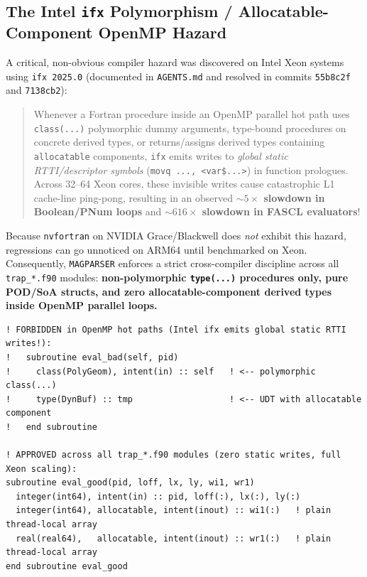 \subsection{The Intel \texttt{ifx} Polymorphism / Allocatable-Component OpenMP Hazard}
A critical, non-obvious compiler hazard was discovered on Intel Xeon systems using \texttt{ifx 2025.0} (documented in \texttt{AGENTS.md} and resolved in commits \texttt{55b8c2f} and \texttt{7138cb2}):
\begin{quote}
  Whenever a Fortran procedure inside an OpenMP parallel hot path uses \texttt{class(...)} polymorphic dummy arguments, type-bound procedures on concrete derived types, or returns/assigns derived types containing \texttt{allocatable} components, \texttt{ifx} emits writes to \emph{global static RTTI/descriptor symbols} (\texttt{movq ..., <var\$...>}) in function prologues. Across 32--64 Xeon cores, these invisible writes cause catastrophic L1 cache-line ping-pong, resulting in an observed \textbf{$\sim 5\times$ slowdown in Boolean/PNum loops} and \textbf{$\sim 616\times$ slowdown in FASCL evaluators}!
\end{quote}
Because \texttt{nvfortran} on NVIDIA Grace/Blackwell does \emph{not} exhibit this hazard, regressions can go unnoticed on ARM64 until benchmarked on Xeon. Consequently, \texttt{MAGPARSER} enforces a strict cross-compiler discipline across all \texttt{trap\_*.f90} modules: \textbf{non-polymorphic \texttt{type(...)} procedures only, pure POD/SoA structs, and zero allocatable-component derived types inside OpenMP parallel loops.}

\begin{lstlisting}[caption={Forbidden polymorphic/allocatable-UDT pattern (causes \texttt{ifx} L1 RTTI ping-pong) vs.\ approved POD/SoA pattern enforced across \texttt{src/trap\_*.f90}.},label={lst:ifx_hazard}]
! FORBIDDEN in OpenMP hot paths (Intel ifx emits global static RTTI writes!):
!   subroutine eval_bad(self, pid)
!     class(PolyGeom), intent(in) :: self   ! <-- polymorphic class(...)
!     type(DynBuf) :: tmp                   ! <-- UDT with allocatable component
!   end subroutine

! APPROVED across all trap_*.f90 modules (zero static writes, full Xeon scaling):
subroutine eval_good(pid, loff, lx, ly, wi1, wr1)
  integer(int64), intent(in) :: pid, loff(:), lx(:), ly(:)
  integer(int64), allocatable, intent(inout) :: wi1(:)   ! plain thread-local array
  real(real64),   allocatable, intent(inout) :: wr1(:)   ! plain thread-local array
end subroutine eval_good
\end{lstlisting}

